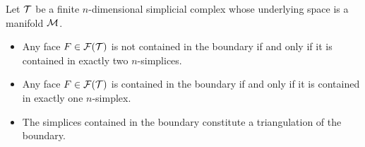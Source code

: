 \documentclass[12pt,a4paper]{article}
\begin{document}
\begin{lemma}\label{lemma:boundarysimplices}
    Let ${\mathcal T}$ be a finite $n$-dimensional simplicial complex whose underlying space is a manifold ${\mathcal M}$. 
    \begin{itemize}
        \item Any face $F \in {\mathcal F}({\mathcal T})$ is not contained in the boundary if and only if it is contained in exactly two $n$-simplices.
        \item Any face $F \in {\mathcal F}({\mathcal T})$ is contained in the boundary if and only if it is contained in exactly one $n$-simplex.
        \item The simplices contained in the boundary constitute a triangulation of the boundary.
    \end{itemize}
\end{lemma}
\end{document}
